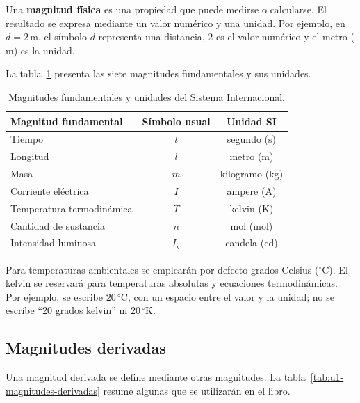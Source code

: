 Una \textbf{magnitud física} es una propiedad que puede medirse o calcularse. El resultado se expresa mediante un valor numérico y una unidad. Por ejemplo, en \(d=2\,\text{m}\), el símbolo \(d\) representa una distancia, \(2\) es el valor numérico y el metro (\(\text{m}\)) es la unidad.

 La tabla~\ref{tab:u1-magnitudes-fundamentales} presenta las siete magnitudes fundamentales y sus unidades.

\begin{table}[htbp]
    \centering
    \begin{tabular}{|l|c|c|}
        \hline
        \textbf{Magnitud fundamental} & \textbf{Símbolo usual} & \textbf{Unidad SI} \\
        \hline
        Tiempo & \(t\) & segundo (\(\text{s}\)) \\
        Longitud & \(l\) & metro (\(\text{m}\)) \\
        Masa & \(m\) & kilogramo (\(\text{kg}\)) \\
        Corriente eléctrica & \(I\) & ampere (\(\text{A}\)) \\
        Temperatura termodinámica & \(T\) & kelvin (\(\text{K}\)) \\
        Cantidad de sustancia & \(n\) & mol (\(\text{mol}\)) \\
        Intensidad luminosa & \(I_\mathrm{v}\) & candela (\(\text{cd}\)) \\
        \hline
    \end{tabular}
    \caption{Magnitudes fundamentales y unidades del Sistema Internacional.}
    \label{tab:u1-magnitudes-fundamentales}
\end{table}

Para temperaturas ambientales se emplearán por defecto grados Celsius (\(^{\circ}\text{C}\)). El kelvin se reservará para temperaturas absolutas y ecuaciones termodinámicas. Por ejemplo, se escribe \(20\,^{\circ}\text{C}\), con un espacio entre el valor y la unidad; no se escribe ``20 grados kelvin'' ni \(20\,^{\circ}\text{K}\).

\subsection{Magnitudes derivadas}
\label{sec:u1-magnitudes-derivadas}

Una magnitud derivada se define mediante otras magnitudes. La tabla~\ref{tab:u1-magnitudes-derivadas} resume algunas que se utilizarán en el libro.

